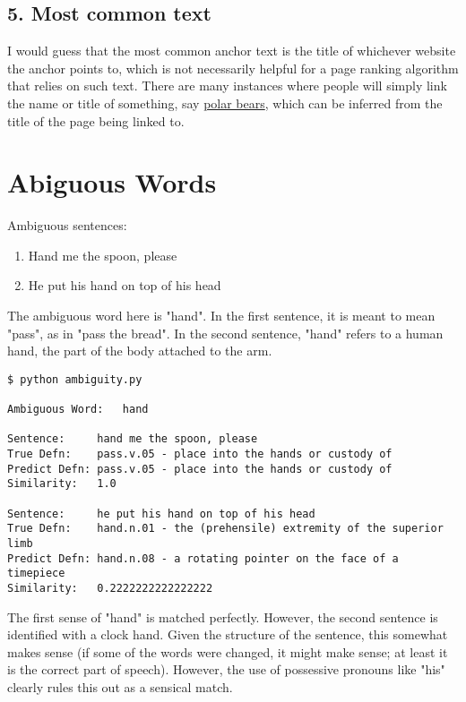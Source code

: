\documentclass[11pt]{article}
\begin{document}
\subsection{5. Most common text}
\label{sec:org3a46f00}
I would guess that the most common anchor text is the title of whichever website
the anchor points to, which is not necessarily helpful for a page ranking
algorithm that relies on such text. There are many instances where people will
simply link the name or title of something, say
\href{https://en.wikipedia.org/wiki/Polar\_bear}{polar bears}, which can be inferred from the title of the page being linked to.

\section{Abiguous Words}
\label{sec:org7347650}
Ambiguous sentences:

\begin{enumerate}
\item Hand me the spoon, please
\item He put his hand on top of his head
\end{enumerate}

The ambiguous word here is "hand". In the first sentence, it is meant to mean
"pass", as in "pass the bread". In the second sentence, "hand" refers to a
human hand, the part of the body attached to the arm.

\begin{verbatim}
$ python ambiguity.py

Ambiguous Word:   hand

Sentence:     hand me the spoon, please
True Defn:    pass.v.05 - place into the hands or custody of
Predict Defn: pass.v.05 - place into the hands or custody of
Similarity:   1.0

Sentence:     he put his hand on top of his head
True Defn:    hand.n.01 - the (prehensile) extremity of the superior limb
Predict Defn: hand.n.08 - a rotating pointer on the face of a timepiece
Similarity:   0.2222222222222222
\end{verbatim}

The first sense of "hand" is matched perfectly. However, the second sentence is
identified with a clock hand. Given the structure of the sentence, this somewhat
makes sense (if some of the words were changed, it might make sense; at least
it is the correct part of speech). However, the use of possessive pronouns like
"his" clearly rules this out as a sensical match.
\end{document}
